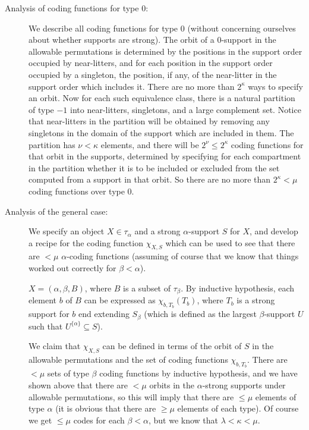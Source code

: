 \documentclass[112pt]{article}
\begin{document}
\begin{description}

\item[Analysis of coding functions for type 0:]  We describe all coding functions for type 0 (without concerning ourselves about whether supports are strong).  The orbit of a 0-support in the allowable permutations is determined by the positions in the support order occupied by near-litters, and for each position in the support order occupied by a singleton, the position, if any, of the near-litter in the support order which includes it.  There are no more than $2^\kappa$ ways to specify an orbit.  Now for each such equivalence class, there is a natural partition of type $-1$ into near-litters, singletons, and a large complement set.  Notice that near-litters in the partition will be obtained by removing any singletons in the domain of the support which are included in them.  The partition has $\nu<\kappa$ elements, and there will be $2^\nu\leq 2^\kappa$ coding functions for that orbit in the supports, determined by specifying for each compartment in the partition whether it is to be included or excluded from the set computed from a support in that orbit.  So there are no more than $2^\kappa<\mu$ coding functions over type 0.

\item[Analysis of the general case:]  We specify an object $X\in \tau_\alpha$ and a strong $\alpha$-support $S$ for $X$, and develop a recipe for the coding function $\chi_{X,S}$ which can be used to see that there are $<\mu$ $\alpha$-coding functions (assuming of course that we know that things worked out correctly for $\beta<\alpha$).

$X = (\alpha,\beta,B)$, where $B$ is a subset of $\tau_\beta$.  By inductive hypothesis, each element $b$ of $B$ can be expressed as $\chi_{b,T_b}(T_b)$, where $T_b$ is a strong support for $b$ end extending $S_\beta$ (which is defined as the largest $\beta$-support $U$ such that $U^{\{\alpha\}} \subseteq S$).

We claim that $\chi_{X,S}$ can be defined in terms of the orbit of $S$ in the allowable permutations and the set of coding functions $\chi_{b,T_b}$.  There are $<\mu$ sets of type $\beta$ coding functions by inductive hypothesis, and we have shown above that there are $<\mu$ orbits in the $\alpha$-strong supports under allowable permutations, so this will imply that there are $\leq \mu$ elements of type $\alpha$ (it is obvious that there are $\geq \mu$ elements of each type).
Of course we get $\leq \mu$ codes for each $\beta<\alpha$, but we know that $\lambda<\kappa<\mu$.


\end{description}
\end{document}
